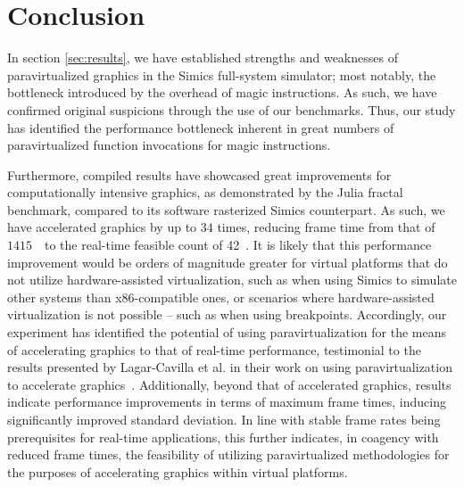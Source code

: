 
\section{Conclusion}
\label{sec:conclusion}
In section \ref{sec:results}, we have established strengths and weaknesses of paravirtualized graphics in the Simics full-system simulator; most notably, the bottleneck introduced by the overhead of magic instructions.
As such, we have confirmed original suspicions through the use of our benchmarks.
Thus, our study has identified the performance bottleneck inherent in great numbers of paravirtualized function invocations for magic instructions.

Furthermore, compiled results have showcased great improvements for computationally intensive graphics, as demonstrated by the Julia fractal benchmark, compared to its software rasterized Simics counterpart.
As such, we have accelerated graphics by up to $34$ times, reducing frame time from that of $1415$~\milli\second\ to the real-time feasible count of 42~\milli\second .
It is likely that this performance improvement would be orders of magnitude greater for virtual platforms that do not utilize hardware-assisted virtualization, such as when using Simics to simulate other systems than x86-compatible ones, or scenarios where hardware-assisted virtualization is not possible -- such as when using breakpoints.
Accordingly, our experiment has identified the potential of using paravirtualization for the means of accelerating graphics to that of real-time performance, testimonial to the results presented by Lagar-Cavilla et al. in their work on using paravirtualization to accelerate graphics~.
Additionally, beyond that of accelerated graphics, results indicate performance improvements in terms of maximum frame times, inducing significantly improved standard deviation.
In line with stable frame rates being prerequisites for real-time applications, this further indicates, in coagency with reduced frame times, the feasibility of utilizing paravirtualized methodologies for the purposes of accelerating graphics within virtual platforms.

